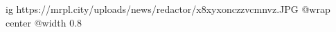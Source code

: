  
 
 
 
 

\ifcmt
  ig https://mrpl.city/uploads/news/redactor/x8xyxonczzvcmnvz.JPG
  @wrap center
  @width 0.8
\fi
